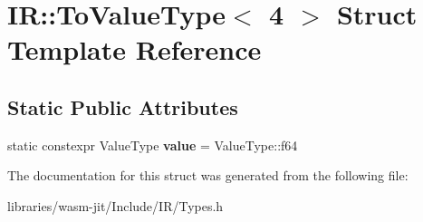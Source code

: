 \hypertarget{struct_i_r_1_1_to_value_type_3_014_01_4}{}\section{IR\+:\+:To\+Value\+Type$<$ 4 $>$ Struct Template Reference}
\label{struct_i_r_1_1_to_value_type_3_014_01_4}
\subsection*{Static Public Attributes}
\begin{DoxyCompactItemize}
\item 
\mbox{\label{struct_i_r_1_1_to_value_type_3_014_01_4_adf57931261a9791b1e9cd47d75ace078}} 
static constexpr Value\+Type {\bfseries value} = Value\+Type\+::f64
\end{DoxyCompactItemize}


The documentation for this struct was generated from the following file\+:\begin{DoxyCompactItemize}
\item 
libraries/wasm-\/jit/\+Include/\+I\+R/Types.\+h\end{DoxyCompactItemize}
